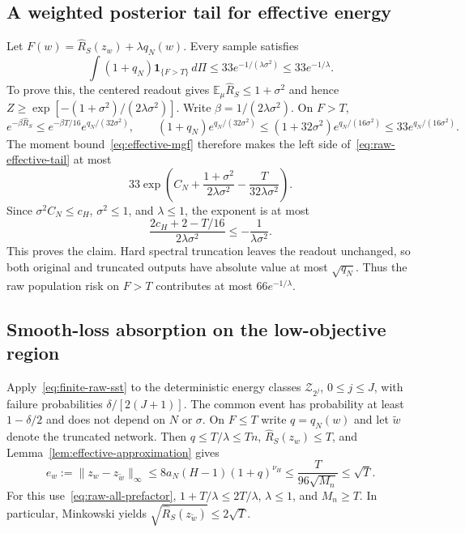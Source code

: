 \subsection{A weighted posterior tail for effective energy}

Let $F(w)=\widehat R_S(z_w)+\lambda q_N(w)$.  Every sample satisfies
\begin{equation}
 \int(1+q_N)\mathbf1_{\{F>T\}}\,d\Pi
       \leq33e^{-1/(\lambda\sigma^2)}\leq33e^{-1/\lambda}.
 \label{eq:raw-effective-tail}
\end{equation}
To prove this, the centered readout gives
$\mathbb E_\mu\widehat R_S\leq1+\sigma^2$ and hence
$Z\geq\exp[-(1+\sigma^2)/(2\lambda\sigma^2)]$.
Write $\beta=1/(2\lambda\sigma^2)$.  On $F>T$,
\[
 e^{-\beta\widehat R_S}
   \leq e^{-\beta T/16}e^{q_N/(32\sigma^2)},\qquad
 (1+q_N)e^{q_N/(32\sigma^2)}
    \leq(1+32\sigma^2)e^{q_N/(16\sigma^2)}
    \leq33e^{q_N/(16\sigma^2)}.
\]
The moment bound~\eqref{eq:effective-mgf} therefore makes the left
side of~\eqref{eq:raw-effective-tail} at most
\[
 33\exp\left(C_N+\frac{1+\sigma^2}{2\lambda\sigma^2}
                         -\frac{T}{32\lambda\sigma^2}\right).
\]
Since $\sigma^2C_N\leq c_H$, $\sigma^2\leq1$, and $\lambda\leq1$,
the exponent is at most
\[
 \frac{2c_H+2-T/16}{2\lambda\sigma^2}
       \leq-\frac1{\lambda\sigma^2}.
\]
This proves the claim.  Hard spectral truncation leaves the readout
unchanged, so both original and truncated outputs have absolute value
at most $\sqrt{q_N}$.  Thus the raw population risk on $F>T$ contributes
at most $66e^{-1/\lambda}$.

\subsection{Smooth-loss absorption on the low-objective region}

Apply~\eqref{eq:finite-raw-sst} to the deterministic energy classes
$\mathcal Z_{2^j}$, $0\leq j\leq J$, with failure probabilities
$\delta/[2(J+1)]$.  The common event has probability at least
$1-\delta/2$ and does not depend on $N$ or $\sigma$.
On $F\leq T$ write $q=q_N(w)$ and let $\widetilde w$ denote the
truncated network.  Then $q\leq T/\lambda\leq Tn$,
$\widehat R_S(z_w)\leq T$, and
Lemma~\ref{lem:effective-approximation} gives
\[
 e_w:=\|z_w-z_{\widetilde w}\|_\infty
       \leq8a_N(H-1)(1+q)^{\nu_H}\leq\frac{T}{96\sqrt{M_n}}
       \leq\sqrt T.
\]
For this use~\eqref{eq:raw-all-prefactor},
$1+T/\lambda\leq2T/\lambda$, $\lambda\leq1$, and $M_n\geq T$.
In particular, Minkowski yields
$\sqrt{\widehat R_S(z_{\widetilde w})}\leq2\sqrt T$.

